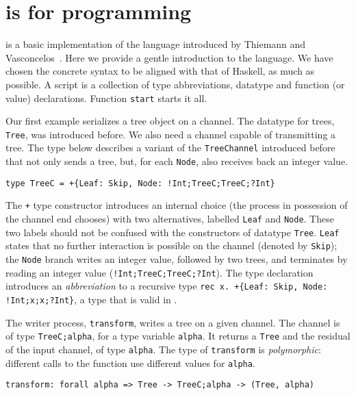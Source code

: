 \section{\freest{} is for programming}
\label{sec:programming}

\freest{} is a basic implementation of the language introduced by
Thiemann and Vasconcelos~\cite{DBLP:conf/icfp/ThiemannV16}. Here we
provide a gentle introduction to the language.
%
We have chosen the concrete syntax to be aligned with that of Haskell,
as much as possible. A \freest{} script is a collection of type
abbreviations, datatype and function (or value) declarations. Function
\lstinline|start| starts it all.

Our first example serializes a tree object on a channel. The datatype
for trees, \lstinline|Tree|, was introduced before.  We also need a
channel capable of transmitting a tree. The type below describes a
variant of the \lstinline|TreeChannel| introduced before that not only
sends a tree, but, for each \lstinline|Node|, also receives back an
integer value.
%
\begin{lstlisting}
type TreeC = +{Leaf: Skip, Node: !Int;TreeC;TreeC;?Int}
\end{lstlisting}

The \lstinline|+| type constructor introduces an internal choice (the
process in possession of the channel end chooses) with two
alternatives, labelled \lstinline|Leaf| and \lstinline|Node|. These
two labels should not be confused with the constructors of 
datatype \lstinline|Tree|. \lstinline|Leaf| states that no further
interaction is possible on the channel (denoted by \lstinline|Skip|);
the \lstinline|Node| branch writes an integer value, followed by two
trees, and terminates by reading an integer value
(\lstinline|!Int;TreeC;TreeC;?Int|).
%
The type declaration introduces an \emph{abbreviation} to a recursive
type \lstinline|rec x. +{Leaf: Skip, Node: !Int;x;x;?Int}|, a type
that is valid in \freest.

The writer process, \lstinline|transform|, writes a tree on a given
channel. The channel is of type \lstinline|TreeC;alpha|, for
a type variable \lstinline|alpha|. It returns a \lstinline|Tree| and
the residual of the input channel, of type \lstinline|alpha|. The type
of \lstinline|transform| is \emph{polymorphic}: different calls to the
function use different values for \lstinline|alpha|.

\begin{lstlisting}
transform: forall alpha => Tree -> TreeC;alpha -> (Tree, alpha)
\end{lstlisting}

